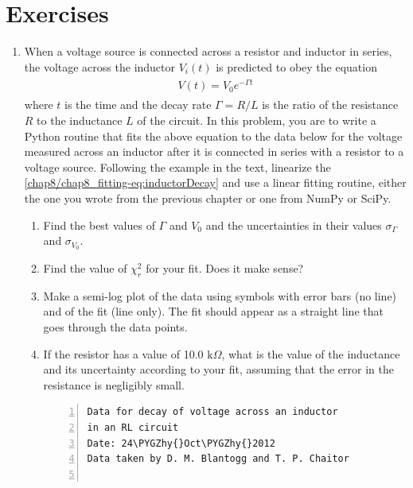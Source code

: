 \documentclass[letterpaper,10pt,english]{sphinxmanual}
\def\PYGZhy{\char`\-}
\begin{document}
\section{Exercises}
\label{chap8/chap8_fitting:exercises}\begin{enumerate}
\item {} 
When a voltage source is connected across a resistor and inductor in series, the voltage across the inductor \(V_i(t)\) is predicted to obey the equation
\label{chap8/chap8_fitting:equation-eq:inductorDecay}\begin{gather}
\begin{split}V(t) = V_0 e^{-\Gamma t}\end{split}\label{chap8/chap8_fitting-eq:inductorDecay}
\end{gather}
where \(t\) is the time and the decay rate \(\Gamma=R/L\) is the ratio of the  resistance \(R\) to the inductance \(L\) of the circuit.  In this problem, you are to write a Python routine that fits the above equation to the data below for the voltage measured across an inductor after it is connected in series with a resistor to a voltage source.  Following the example in the text, linearize the \eqref{chap8/chap8_fitting-eq:inductorDecay} and use a linear fitting routine, either the one you wrote from the previous chapter or one from NumPy or SciPy.
\begin{enumerate}
\item {} 
Find the best values of \(\Gamma\) and \(V_0\) and the uncertainties in their values \(\sigma_\Gamma\) and \(\sigma_{V_0}\).

\item {} 
Find the value of \(\chi_r^2\) for your fit.  Does it make sense?

\item {} 
Make a semi-log plot of the data using symbols with error bars (no line) and of the fit (line only).  The fit should appear as a straight line that goes through the data points.

\item {} 
If the resistor has a value of 10.0 \(\mathrm{k}\Omega\), what is the value of the inductance and its uncertainty according to your fit, assuming that the error in the resistance is negligibly small.

\begin{Verbatim}[commandchars=\\\{\},numbers=left,firstnumber=1,stepnumber=1]
Data for decay of voltage across an inductor
in an RL circuit
Date: 24\PYGZhy{}Oct\PYGZhy{}2012
Data taken by D. M. Blantogg and T. P. Chaitor


\end{Verbatim}
\end{enumerate}
\end{enumerate}
\end{document}
